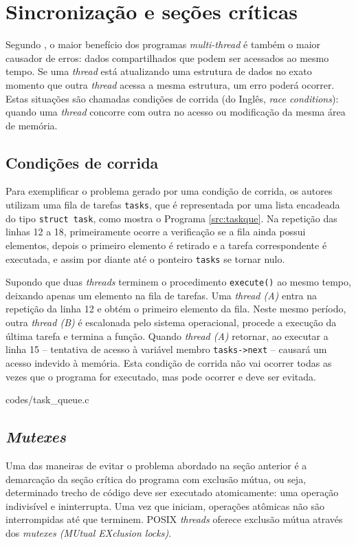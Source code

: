 \documentclass[ccc, pg2]{esinucpel}
\begin{document}
\section{Sincronização e seções críticas}
Segundo \cite{bib:advlinprog}, o maior benefício dos programas {\it multi-thread} é também o maior causador de erros: dados compartilhados que podem ser acessados ao mesmo tempo. Se uma {\it thread} está atualizando uma estrutura de dados no exato momento que outra {\it thread} acessa a mesma estrutura, um erro poderá ocorrer. Estas situações são chamadas condições de corrida (do Inglês, {\it race conditions}): quando uma {\it thread} concorre com outra no acesso ou modificação da mesma área de memória.

\subsection{Condições de corrida}
Para exemplificar o problema gerado por uma condição de corrida, os autores \cite{bib:advlinprog} utilizam uma fila de tarefas {\tt tasks}, que é representada por uma lista encadeada do tipo {\tt struct task}, como mostra o Programa \ref{src:taskque}. Na repetição das linhas 12 a 18, primeiramente ocorre a verificação se a fila ainda possui elementos, depois o primeiro elemento é retirado e a tarefa correspondente é executada, e assim por diante até o ponteiro {\tt tasks} se tornar nulo.

Supondo que duas {\it threads} terminem o procedimento {\tt execute()} ao mesmo tempo, deixando apenas um elemento na fila de tarefas. Uma {\it thread (A)} entra na repetição da linha 12 e obtém o primeiro elemento da fila. Neste mesmo período, outra {\it thread (B)} é escalonada pelo sistema operacional, procede a execução da última tarefa e termina a função. Quando {\it thread (A)} retornar, ao executar a linha 15 -- tentativa de acesso à variável membro {\tt tasks->next} -- causará um acesso indevido à memória. Esta condição de corrida não vai ocorrer todas as vezes que o programa for executado, mas pode ocorrer e deve ser evitada. \vskip 10pt


								 {codes/task_queue.c}


\subsection{\textit{Mutexes}}
Uma das maneiras de evitar o problema abordado na seção anterior é a demarcação da seção crítica do programa com exclusão mútua, ou seja, determinado trecho de código deve ser executado atomicamente: uma operação indivisível e ininterrupta. Uma vez que iniciam, operações atômicas não são interrompidas até que terminem. POSIX {\it threads} oferece exclusão mútua através dos {\it mutexes (MUtual EXclusion locks)}.
\end{document}
